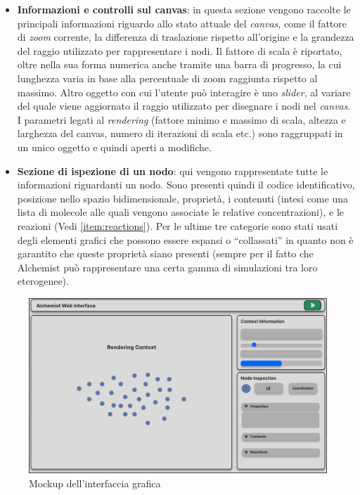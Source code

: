 \begin{itemize}
	\item \textbf{Informazioni e controlli sul canvas}: in questa sezione vengono raccolte le principali informazioni riguardo allo stato attuale del \textit{canvas}, come il fattore di \textit{zoom} corrente, la differenza di traslazione rispetto all'origine e la grandezza del raggio utilizzato per rappresentare i nodi. Il fattore di scala è riportato, oltre nella sua forma numerica anche tramite una barra di progresso, la cui lunghezza varia in base alla percentuale di zoom raggiunta rispetto al massimo. Altro oggetto con cui l'utente può interagire è uno \textit{slider}, al variare del quale viene aggiornato il raggio utilizzato per disegnare i nodi nel \textit{canvas}. I parametri legati al \textit{rendering} (fattore minimo e massimo di scala, altezza e larghezza del canvas, numero di iterazioni di scala etc.) sono raggruppati in un unico oggetto e quindi aperti a modifiche.
	\item \textbf{Sezione di ispezione di un nodo}\label{item:node-inspection}: qui vengono rappresentate tutte le informazioni riguardanti un nodo. Sono presenti quindi il codice identificativo, posizione nello spazio bidimensionale, proprietà, i contenuti (intesi come una lista di molecole alle quali vengono associate le relative concentrazioni), e le reazioni (Vedi \ref{item:reactions}). Per le ultime tre categorie sono stati usati degli elementi grafici che possono essere espansi o ``collassati'' in quanto non è garantito che queste proprietà siano presenti (sempre per il fatto che Alchemist può rappresentare una certa gamma di simulazioni tra loro eterogenee).
\end{itemize}

\begin{figure}[htb]
	\centering
	\includegraphics[scale=0.65]{imgs/Interface_Layout.pdf}
	\caption{Mockup dell'interfaccia grafica}
	\label{fig:interface-layout}
\end{figure}

